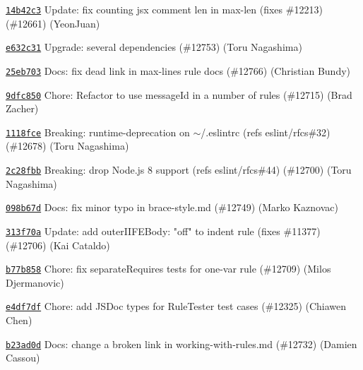 \begin{DoxyItemize}
\item \href{https://github.com/eslint/eslint/commit/14b42c386be3387c415267b789f277e1294d4567}{\texttt{ {\ttfamily 14b42c3}}} Update\+: fix counting jsx comment len in max-\/len (fixes \#12213) (\#12661) (Yeon\+Juan)
\item \href{https://github.com/eslint/eslint/commit/e632c31d7e5363f1347b787702ecd4a85f5c11a2}{\texttt{ {\ttfamily e632c31}}} Upgrade\+: several dependencies (\#12753) (Toru Nagashima)
\item \href{https://github.com/eslint/eslint/commit/25eb703c8758563988ffb497a53f89a3ed345399}{\texttt{ {\ttfamily 25eb703}}} Docs\+: fix dead link in max-\/lines rule docs (\#12766) (Christian Bundy)
\item \href{https://github.com/eslint/eslint/commit/9dfc8501fb1956c90dc11e6377b4cb38a6bea65d}{\texttt{ {\ttfamily 9dfc850}}} Chore\+: Refactor to use message\+Id in a number of rules (\#12715) (Brad Zacher)
\item \href{https://github.com/eslint/eslint/commit/1118fceb49af3436b8dcd0c6089f913cedf9a329}{\texttt{ {\ttfamily 1118fce}}} Breaking\+: runtime-\/deprecation on \textquotesingle{}\texorpdfstring{$\sim$}{\string~}/.eslintrc\textquotesingle{} (refs eslint/rfcs\#32) (\#12678) (Toru Nagashima)
\item \href{https://github.com/eslint/eslint/commit/2c28fbbb563a44282bef0c9fcc9be29d611cc83b}{\texttt{ {\ttfamily 2c28fbb}}} Breaking\+: drop Node.\+js 8 support (refs eslint/rfcs\#44) (\#12700) (Toru Nagashima)
\item \href{https://github.com/eslint/eslint/commit/098b67d04a4b4dc8ef4faa6434c6ef5abbde3ed3}{\texttt{ {\ttfamily 098b67d}}} Docs\+: fix minor typo in brace-\/style.\+md (\#12749) (Marko Kaznovac)
\item \href{https://github.com/eslint/eslint/commit/313f70ac9a3cf5d1558d2427b00dd75666e18cf4}{\texttt{ {\ttfamily 313f70a}}} Update\+: add outer\+IIFEBody\+: "{}off"{} to indent rule (fixes \#11377) (\#12706) (Kai Cataldo)
\item \href{https://github.com/eslint/eslint/commit/b77b8585e33fc4bb438a0e11ca8177c7eb91dbd8}{\texttt{ {\ttfamily b77b858}}} Chore\+: fix separate\+Requires tests for one-\/var rule (\#12709) (Milos Djermanovic)
\item \href{https://github.com/eslint/eslint/commit/e4df7dfb0199badb61d2c03ff4f7e4be735279d9}{\texttt{ {\ttfamily e4df7df}}} Chore\+: add JSDoc types for Rule\+Tester test cases (\#12325) (Chiawen Chen)
\item \href{https://github.com/eslint/eslint/commit/b23ad0d789a909baf8d7c41a35bc53df932eaf30}{\texttt{ {\ttfamily b23ad0d}}} Docs\+: change a broken link in working-\/with-\/rules.\+md (\#12732) (Damien Cassou)

\end{DoxyItemize}
